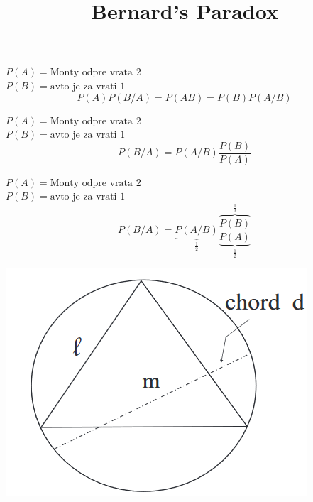 \documentclass[12pt]{beamer}
\begin{document}
\begin{frame}
  $P(A)=\text{Monty odpre vrata 2}$\\
  $P(B)=\text{avto je za vrati 1}$
  $$P(A)P(B/A)=P(AB)=P(B)P(A/B)$$

\end{frame}
\begin{frame}
    $P(A)=\text{Monty odpre vrata 2}$\\
    $P(B)=\text{avto je za vrati 1}$
    $$P(B/A)=P(A/B)\frac{P(B)}{P(A)}$$
\end{frame}
\begin{frame}
    $P(A)=\text{Monty odpre vrata 2}$\\
    $P(B)=\text{avto je za vrati 1}$
    $$P(B/A)=\underbrace{P(A/B)}_{\frac{1}{2}}\frac{\overbrace {P(B)}^{\frac{1}{3}}}{\underbrace{P(A)}_{\frac{1}{2}}}$$
\end{frame}
\title{Bernard's Paradox}
\begin{frame}
  \maketitle
\end{frame}
\begin{frame}
  \includegraphics[width=\textwidth]{Bernard_1.png}
\end{frame}
\end{document}
